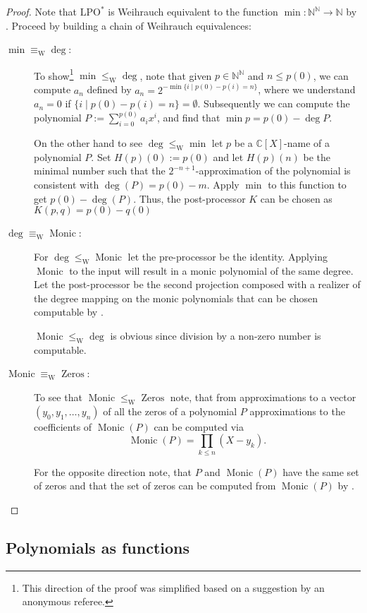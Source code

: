 \documentclass{eptcs-modified}
\newcommand{\Baire}{{\mathbb{N}^\mathbb{N}}}
\newcommand{\lpo}{\textrm{LPO}}
\newcommand{\leqW}{\leq_{\textrm{W}}}
\newcommand{\equivW}{\equiv_{\textrm{W}}}
\newcommand{\NN}{\mathbb{N}}
\newcommand{\CC}{\mathbb{C}}
\newcommand{\Monic}{\operatorname{Monic}}
\newcommand{\Zeros}{\operatorname{Zeros}}
\begin{document}
			\begin{proof}
				Note that  $\lpo^*$ is Weihrauch equivalent to the function $\min:\Baire \to \NN$ by .
				Proceed by building a chain of Weihrauch equivalences:
				\begin{description}
					\item[$\min\equivW\deg$:]
					To show\footnote{This direction of the proof was simplified based on a suggestion by an anonymous referee.} $\min\leqW\deg$, note that given $p \in \Baire$ and $n \leq p(0)$, we can compute $a_n$ defined by $a_n = 2^{-\min \{i \mid p(0) - p(i) = n\}}$, where we understand $a_n = 0$ if $\{i \mid p(0) - p(i) = n\}  =\emptyset$. Subsequently we can compute the polynomial $P := \sum_{i=0}^{p(0)} a_ix^i$, and find that $\min p = p(0) - \deg P$.

          On the other hand to see $\deg\leqW\min$ let $p$ be a $\CC[X]$-name of a polynomial $P$.
          Set $H(p)(0):= p(0)$ and let $H(p)(n)$ be the minimal number such that the $2^{-n+1}$-approximation of the polynomial is consistent with $\deg(P)=p(0)-m$.
          Apply $\min$ to this function to get $p(0)-\deg(P)$.
          Thus, the post-processor $K$ can be chosen as $K(p,q) = p(0)-q(0)$
					\item[$\deg\equivW\Monic$:]
					For $\deg\leqW\Monic$ let the pre-processor be the identity.
					Applying $\Monic$ to the input will result in a monic polynomial of the same degree.
					Let the post-processor be the second projection composed with a realizer of the degree mapping on the monic polynomials that can be chosen computable by .

					$\Monic\leqW\deg$ is obvious since division by a non-zero number is computable.
					\item[$\Monic\equivW\Zeros$:]
					To see that $\Monic\leqW\Zeros$ note, that from approximations to a vector $(y_0, y_1, \ldots, y_n)$ of all the zeros of a polynomial $P$ approximations to the coefficients of $\Monic(P)$ can be computed via
					\[ \Monic(P) = \prod_{k \leq n} (X - y_k). \]

					For the opposite direction note, that $P$ and $\Monic(P)$ have the same set of zeros and that the set of zeros can be computed from $\Monic(P)$ by .
				\end{description}
			\end{proof}

		\subsection{Polynomials as functions}\label{sec:sub:polynomials as functions}
\end{document}
